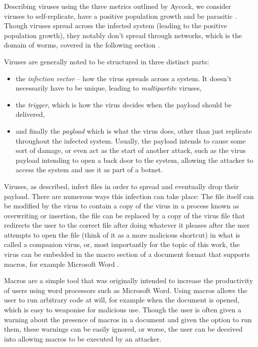 Describing viruses using the three metrics outlined by Aycock, we consider viruses to self-replicate, have a positive 
population growth and be parasitic \cite[p.~14]{aycock-book}. Though viruses spread across the infected system 
(leading to the positive population growth), they notably don't spread through networks, which is the domain of worms, 
covered in the following section \cite[p.~15]{aycock-book}.

Viruses are generally noted to be structured in three distinct parts: 
\begin{itemize}
  \item the \emph{infection vector} -- how the virus spreads across a system. It doesn't necessarily have to be unique,
    leading to \emph{multipartite} viruses, 
  \item the \emph{trigger}, which is how the virus decides when the payload should be delivered,
  \item and finally the \emph{payload} which is what the virus does, other than just replicate throughout the infected
    system. Usually, the payload intends to cause some sort of damage, or even act as the start of another attack, such
    as the virus payload intending to open a back door to the system, allowing the attacker to access the system and use
    it as part of a botnet.
\end{itemize}
\cite[p.~7, p.~27]{viruses-revealed-book,aycock-book}

Viruses, as described, infect files in order to spread and eventually drop their payload. There are numerous ways this
infection can take place: The file itself can be modified by the virus to contain a copy of the virus in a process known
as overwriting or insertion, the file can be replaced by a copy of the virus file that redirects the user to the
correct file after doing whatever it pleases after the user attempts to open the file (think of it as a more malicious 
shortcut) in what is called a companion virus, or, most importantly for the topic of this work, the virus can be
embedded in the macro section of a document format that supports macros, for example Microsoft Word \cite{aycock-book,
skoudis-book}. 

Macros are a simple tool that was originally intended to increase the productivity of users using word
processors such as Microsoft Word. Using macros allows the user to run arbitrary code at will, for example when the
document is opened, which is easy to weaponise for malicious use. Though the user is often given a warning about the
presence of macros in a document and given the option to run them, these warnings can be easily ignored, or worse, the
user can be deceived into allowing macros to be executed by an attacker.

